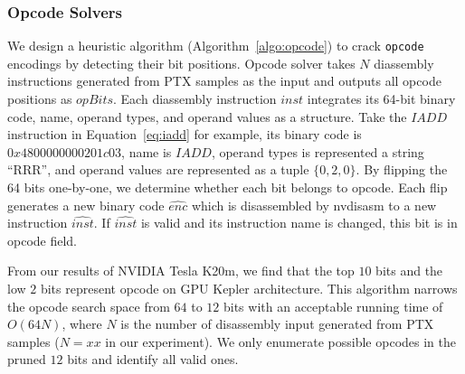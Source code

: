 \subsubsection{Opcode Solvers}
We design a heuristic algorithm (Algorithm~\ref{algo:opcode}) to crack {\tt opcode} encodings by detecting their bit positions.
Opcode solver takes $N$ diassembly instructions generated from PTX samples as the input and outputs all opcode positions as $opBits$.
Each diassembly instruction $inst$ integrates its 64-bit binary code, name, operand types, and operand values as a structure.
Take the $IADD$ instruction in Equation~\ref{eq:iadd} for example, its binary code is $0x4800000000201c03$, name is $IADD$, operand types is represented a string ``RRR'', and operand values are represented as a tuple $\{ 0,2,0 \}$.
By flipping the 64 bits one-by-one, we determine whether each bit belongs to opcode.
Each flip generates a new binary code $\widehat{enc}$ which is disassembled by nvdisasm to a new instruction $\widehat{inst}$.
If $\widehat{inst}$ is valid and its instruction name is changed, this bit is in opcode field.


From our results of NVIDIA Tesla K20m, we find that the top $10$ bits and the low $2$ bits represent opcode on GPU Kepler architecture.
This algorithm narrows the opcode search space from $64$ to $12$ bits with an acceptable running time of $O(64N)$, where $N$ is the number of disassembly input generated from PTX samples ($N=xx$ in our experiment).
We only enumerate possible opcodes in the pruned $12$ bits and identify all valid ones.


